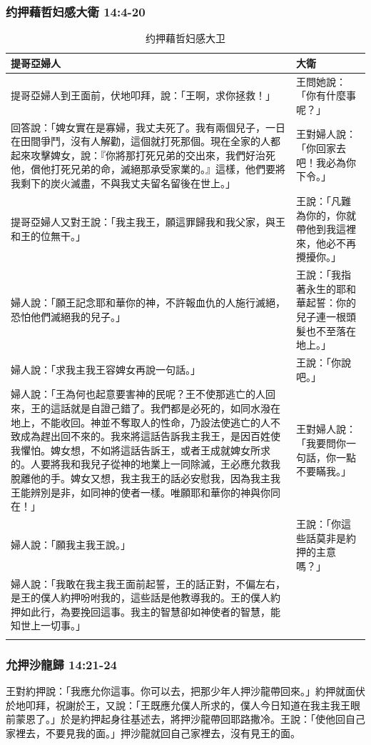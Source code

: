 \subsubsection{约押藉哲妇感大衛 14:4-20}
\begin{table}[H]
\hspace*{-7mm}
\centering 
\begin{tabular}{p{12.25cm}|p{5.95cm}}\hline\hline
提哥亞婦人&大衛\\\hline
提哥亞婦人到王面前，伏地叩拜，說：「王啊，求你拯救！」&王問她說：「你有什麼事呢？」\\\hline
回答說：「婢女實在是寡婦，我丈夫死了。我有兩個兒子，一日在田間爭鬥，沒有人解勸，這個就打死那個。現在全家的人都起來攻擊婢女，說：『你將那打死兄弟的交出來，我們好治死他，償他打死兄弟的命，滅絕那承受家業的。』這樣，他們要將我剩下的炭火滅盡，不與我丈夫留名留後在世上。」&王對婦人說：「你回家去吧！我必為你下令。」\\\hline
提哥亞婦人又對王說：「我主我王，願這罪歸我和我父家，與王和王的位無干。」&王說：「凡難為你的，你就帶他到我這裡來，他必不再攪擾你。」\\\hline
婦人說：「願王記念耶和華你的神，不許報血仇的人施行滅絕，恐怕他們滅絕我的兒子。」&王說：「我指著永生的耶和華起誓：你的兒子連一根頭髮也不至落在地上。」\\\hline
婦人說：「求我主我王容婢女再說一句話。」&王說：「你說吧。」\\\hline
婦人說：「王為何也起意要害神的民呢？王不使那逃亡的人回來，王的這話就是自證己錯了。我們都是必死的，如同水潑在地上，不能收回。神並不奪取人的性命，乃設法使逃亡的人不致成為趕出回不來的。我來將這話告訴我主我王，是因百姓使我懼怕。婢女想，不如將這話告訴王，或者王成就婢女所求的。人要將我和我兒子從神的地業上一同除滅，王必應允救我脫離他的手。婢女又想，我主我王的話必安慰我，因為我主我王能辨別是非，如同神的使者一樣。唯願耶和華你的神與你同在！」&王對婦人說：「我要問你一句話，你一點不要瞞我。」\\\hline
婦人說：「願我主我王說。」&王說：「你這些話莫非是約押的主意嗎？」\\\hline
婦人說：「我敢在我主我王面前起誓，王的話正對，不偏左右，是王的僕人約押吩咐我的，這些話是他教導我的。王的僕人約押如此行，為要挽回這事。我主的智慧卻如神使者的智慧，能知世上一切事。」&\\\hline
&\\\hline
\end{tabular}
\caption{约押藉哲妇感大卫}
\end{table}


\subsubsection{允押沙龍歸 14:21-24}
王對約押說：「我應允你這事。你可以去，把那少年人押沙龍帶回來。」約押就面伏於地叩拜，祝謝於王，又說：「王既應允僕人所求的，僕人今日知道在我主我王眼前蒙恩了。」於是約押起身往基述去，將押沙龍帶回耶路撒冷。王說：「使他回自己家裡去，不要見我的面。」押沙龍就回自己家裡去，沒有見王的面。

